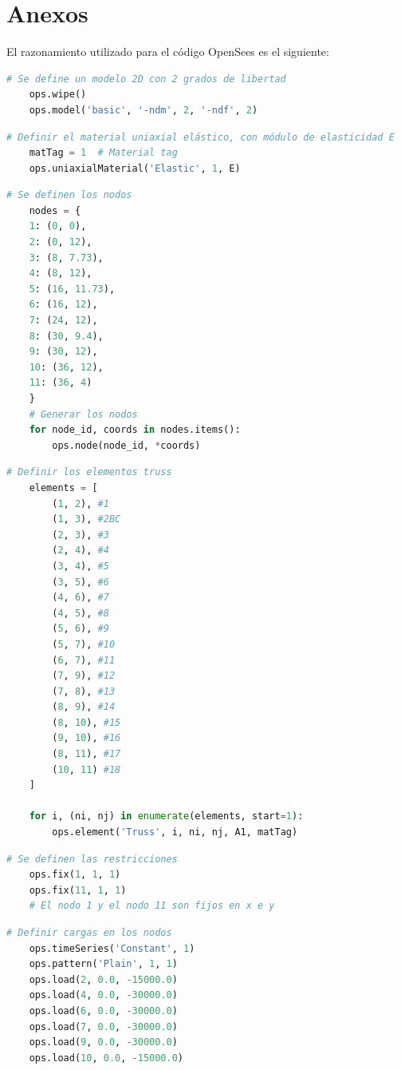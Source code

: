 \newpage
\section{Anexos}

El razonamiento utilizado para el código OpenSees es el siguiente:

\begin{lstlisting}[language=Python]
    # Se define un modelo 2D con 2 grados de libertad
    ops.wipe()
    ops.model('basic', '-ndm', 2, '-ndf', 2)
\end{lstlisting}

\begin{lstlisting}[language=Python]
    # Definir el material uniaxial elástico, con módulo de elasticidad E
    matTag = 1  # Material tag
    ops.uniaxialMaterial('Elastic', 1, E)
\end{lstlisting}

\begin{lstlisting}[language=Python]
    # Se definen los nodos
    nodes = {
    1: (0, 0),
    2: (0, 12),
    3: (8, 7.73),
    4: (8, 12),
    5: (16, 11.73),
    6: (16, 12),
    7: (24, 12),
    8: (30, 9.4),
    9: (30, 12),
    10: (36, 12),
    11: (36, 4)
    }
    # Generar los nodos
    for node_id, coords in nodes.items():
        ops.node(node_id, *coords)
\end{lstlisting}

\begin{lstlisting}[language=Python]
    # Definir los elementos truss
    elements = [
        (1, 2), #1
        (1, 3), #2BC
        (2, 3), #3
        (2, 4), #4
        (3, 4), #5
        (3, 5), #6
        (4, 6), #7
        (4, 5), #8
        (5, 6), #9
        (5, 7), #10
        (6, 7), #11
        (7, 9), #12
        (7, 8), #13
        (8, 9), #14
        (8, 10), #15
        (9, 10), #16
        (8, 11), #17
        (10, 11) #18
    ]

    for i, (ni, nj) in enumerate(elements, start=1):
        ops.element('Truss', i, ni, nj, A1, matTag)
\end{lstlisting}

\begin{lstlisting}[language=Python]
    # Se definen las restricciones
    ops.fix(1, 1, 1)  
    ops.fix(11, 1, 1)  
    # El nodo 1 y el nodo 11 son fijos en x e y
\end{lstlisting}

\begin{lstlisting}[language=Python]
    # Definir cargas en los nodos
    ops.timeSeries('Constant', 1)
    ops.pattern('Plain', 1, 1)
    ops.load(2, 0.0, -15000.0)
    ops.load(4, 0.0, -30000.0)
    ops.load(6, 0.0, -30000.0)
    ops.load(7, 0.0, -30000.0)
    ops.load(9, 0.0, -30000.0)
    ops.load(10, 0.0, -15000.0)
\end{lstlisting}

